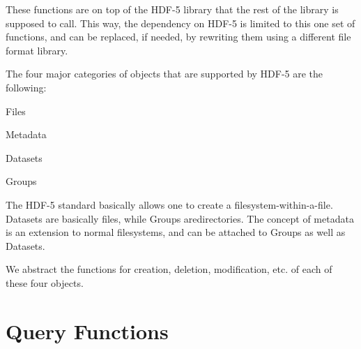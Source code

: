 These functions are on top of the H\+D\+F-\/5 library that the rest of the library is supposed to call. This way, the dependency on H\+D\+F-\/5 is limited to this one set of functions, and can be replaced, if needed, by rewriting them using a different file format library.

The four major categories of objects that are supported by H\+D\+F-\/5 are the following\+:

\begin{DoxyItemize}
\item Files \item Metadata \item Datasets \item Groups\end{DoxyItemize}
The H\+D\+F-\/5 standard basically allows one to create a filesystem-\/within-\/a-\/file. Datasets are basically {\ttfamily files\textquotesingle{}\textquotesingle{}, while Groups are}directories\textquotesingle{}\textquotesingle{}. The concept of metadata is an extension to normal filesystems, and can be attached to Groups as well as Datasets.

We abstract the functions for creation, deletion, modification, etc. of each of these four objects.\hypertarget{hdf_library_object_query_functions}{}\section{Query Functions}\label{hdf_library_object_query_functions}

